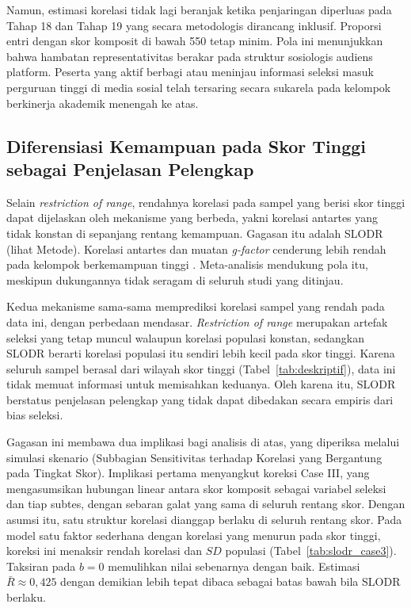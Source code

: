 Namun, estimasi korelasi tidak lagi beranjak ketika penjaringan diperluas pada Tahap 18 dan Tahap 19 yang secara metodologis dirancang inklusif. Proporsi entri dengan skor komposit di bawah 550 tetap minim. Pola ini menunjukkan bahwa hambatan representativitas berakar pada struktur sosiologis audiens platform. Peserta yang aktif berbagi atau meninjau informasi seleksi masuk perguruan tinggi di media sosial telah tersaring secara sukarela pada kelompok berkinerja akademik menengah ke atas.

\subsection{Diferensiasi Kemampuan pada Skor Tinggi sebagai Penjelasan Pelengkap}
Selain \textit{restriction of range}, rendahnya korelasi pada sampel yang berisi skor tinggi dapat dijelaskan oleh mekanisme yang berbeda, yakni korelasi antartes yang tidak konstan di sepanjang rentang kemampuan. Gagasan itu adalah SLODR (lihat Metode). Korelasi antartes dan muatan \textit{g-factor} cenderung lebih rendah pada kelompok berkemampuan tinggi \autocite{spearman1927,detterman1989}. Meta-analisis \textcite{blum2017} mendukung pola itu, meskipun dukungannya tidak seragam di seluruh studi yang ditinjau.

Kedua mekanisme sama-sama memprediksi korelasi sampel yang rendah pada data ini, dengan perbedaan mendasar. \textit{Restriction of range} merupakan artefak seleksi yang tetap muncul walaupun korelasi populasi konstan, sedangkan SLODR berarti korelasi populasi itu sendiri lebih kecil pada skor tinggi. Karena seluruh sampel berasal dari wilayah skor tinggi (Tabel~\ref{tab:deskriptif}), data ini tidak memuat informasi untuk memisahkan keduanya. Oleh karena itu, SLODR berstatus penjelasan pelengkap yang tidak dapat dibedakan secara empiris dari bias seleksi.

Gagasan ini membawa dua implikasi bagi analisis di atas, yang diperiksa melalui simulasi skenario (Subbagian Sensitivitas terhadap Korelasi yang Bergantung pada Tingkat Skor). Implikasi pertama menyangkut koreksi Case III, yang mengasumsikan hubungan linear antara skor komposit sebagai variabel seleksi dan tiap subtes, dengan sebaran galat yang sama di seluruh rentang skor. Dengan asumsi itu, satu struktur korelasi dianggap berlaku di seluruh rentang skor. Pada model satu faktor sederhana dengan korelasi yang menurun pada skor tinggi, koreksi ini menaksir rendah korelasi dan $SD$ populasi (Tabel~\ref{tab:slodr_case3}). Taksiran pada $b = 0$ memulihkan nilai sebenarnya dengan baik. Estimasi $\bar{R} \approx 0,425$ dengan demikian lebih tepat dibaca sebagai batas bawah bila SLODR berlaku.

